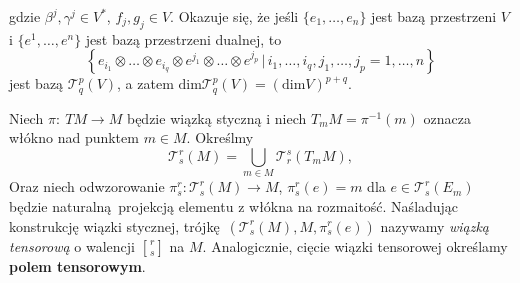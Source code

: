 gdzie \(\beta^j, \gamma^j \in V^\ast\), \(f_j, g_j\in V\).
Okazuje się, że jeśli \(\{e_1, \dots, e_n\}\) jest bazą przestrzeni \(V\) i \(\{e^1, \dots, e^n\}\) jest bazą przestrzeni dualnej, to
\begin{equation*}
    \left\{e_{i_1} \otimes \dots \otimes e_{i_q} \otimes e^{j_1} \otimes \dots \otimes e^{j_p} \, | \, i_1, \dots, i_q, j_1, \dots, j_p = 1, \dots, n \right\} 
\end{equation*}
jest bazą \(\mathcal{T}_q^p(V)\), a zatem \(\mathrm{dim}\mathcal{T}_q^p(V) = (\mathrm{dim}V)^{p+q}\). 

Niech \(\pi:\:TM\to M\) będzie wiązką styczną i niech \(T_m M = \pi^{-1}(m)\) oznacza włókno nad punktem \(m\in M\). Określmy
\begin{equation*}
    \mathcal{T}_s^r(M)=\bigcup\limits_{m\in M} \mathcal{T}_r^s(T_m M),
\end{equation*}
Oraz niech odwzorowanie \(\pi_s^r:\mathcal{T}_s^r(M)\to M\), \(\pi_s^r(e) = m\) dla \(e\in \mathcal{T}_s^r(E_m)\) będzie naturalną projekcją elementu z włókna na rozmaitość. Naśladując konstrukcję wiązki stycznej, trójkę \((\mathcal{T}_s^r(M), M, \pi_s^r(e))\) nazywamy \emph{wiązką tensorową} o walencji \(r \brack s\) na \(M\). Analogicznie, cięcie wiązki tensorowej określamy \textbf{polem tensorowym}. 

